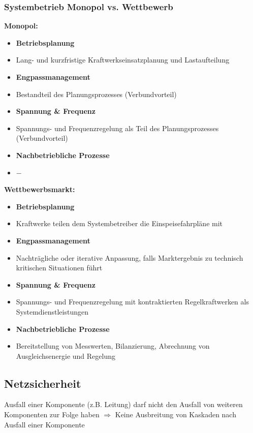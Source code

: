     \subsubsection{Systembetrieb Monopol vs. Wettbewerb}
        \textbf{Monopol:}
        \begin{itemize}
            \item \textbf{Betriebsplanung}          
            \item[] Lang- und kurzfristige Kraftwerkseinsatzplanung und Lastaufteilung             
            \item \textbf{Engpassmanagement}        
            \item[] Bestandteil des Planungsprozesses (Verbundvorteil)                             
            \item \textbf{Spannung \& Frequenz}     
            \item[] Spannungs- und Frequenzregelung als Teil des Planungsprozesses (Verbundvorteil)
            \item \textbf{Nachbetriebliche Prozesse}
            \item[] $-$
        \end{itemize}

        \textbf{Wettbewerbsmarkt:}
        \begin{itemize}
            \item \textbf{Betriebsplanung}          
            \item[] Kraftwerke teilen dem Systembetreiber die Einspeisefahrpläne mit            
            \item \textbf{Engpassmanagement}        
            \item[] Nachträgliche oder iterative Anpassung, falls Marktergebnis zu technisch kritischen Situationen führt                             
            \item \textbf{Spannung \& Frequenz}     
            \item[] Spannungs- und Frequenzregelung mit kontraktierten Regelkraftwerken als Systemdienstleistungen
            \item \textbf{Nachbetriebliche Prozesse}
            \item[] Bereitstellung von Messwerten, Bilanzierung, Abrechnung von Ausgleichsenergie und Regelung
        \end{itemize}

\subsection{Netzsicherheit}
    Ausfall einer Komponente (z.B. Leitung) darf nicht den Ausfall von weiteren Komponenten zur Folge haben $\Rightarrow$
    Keine Ausbreitung von Kaskaden nach Ausfall einer Komponente

